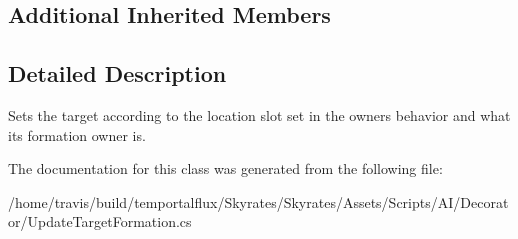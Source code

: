 \subsection*{Additional Inherited Members}


\subsection{Detailed Description}
Sets the target according to the location slot set in the owners behavior and what its formation owner is. 



The documentation for this class was generated from the following file\-:\begin{DoxyCompactItemize}
\item 
/home/travis/build/temportalflux/\-Skyrates/\-Skyrates/\-Assets/\-Scripts/\-A\-I/\-Decorator/Update\-Target\-Formation.\-cs\end{DoxyCompactItemize}
